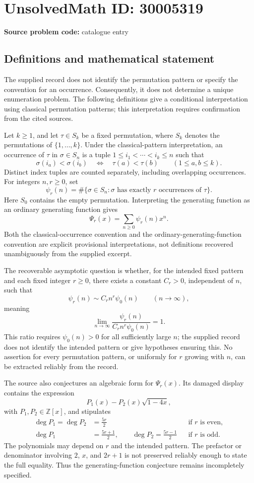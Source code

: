 \documentclass[11pt]{article}
\newcommand{\Z}{\mathbb{Z}}
\begin{document}
\section*{UnsolvedMath ID: 30005319}
\textbf{Source problem code:} catalogue entry
\subsection{Definitions and mathematical statement}
The supplied record does not identify the permutation pattern or specify the convention for an occurrence. Consequently, it does not determine a unique enumeration problem. The following definitions give a conditional interpretation using classical permutation patterns; this interpretation requires confirmation from the cited sources.

Let \(k\geq 1\), and let \(\tau\in S_k\) be a fixed permutation, where \(S_k\) denotes the permutations of \(\{1,\ldots,k\}\). Under the classical-pattern interpretation, an occurrence of \(\tau\) in \(\sigma\in S_n\) is a tuple \(1\leq i_1<\cdots<i_k\leq n\) such that
\[
\sigma(i_a)<\sigma(i_b)\quad\Longleftrightarrow\quad\tau(a)<\tau(b)
\qquad(1\leq a,b\leq k).
\]
Distinct index tuples are counted separately, including overlapping occurrences. For integers \(n,r\geq0\), set
\[
\psi_r(n)=\#\{\sigma\in S_n:\sigma\text{ has exactly }r\text{ occurrences of }\tau\}.
\]
Here \(S_0\) contains the empty permutation. Interpreting the generating function as an ordinary generating function gives
\[
\Psi_r(x)=\sum_{n\geq0}\psi_r(n)x^n.
\]
Both the classical-occurrence convention and the ordinary-generating-function convention are explicit provisional interpretations, not definitions recovered unambiguously from the supplied excerpt.

The recoverable asymptotic question is whether, for the intended fixed pattern and each fixed integer \(r\geq0\), there exists a constant \(C_r>0\), independent of \(n\), such that
\[
\psi_r(n)\sim C_r n^r\psi_0(n)\qquad(n\to\infty),
\]
meaning
\[
\lim_{n\to\infty}\frac{\psi_r(n)}{C_r n^r\psi_0(n)}=1.
\]
This ratio requires \(\psi_0(n)>0\) for all sufficiently large \(n\); the supplied record does not identify the intended pattern or give hypotheses ensuring this. No assertion for every permutation pattern, or uniformly for \(r\) growing with \(n\), can be extracted reliably from the record.

The source also conjectures an algebraic form for \(\Psi_r(x)\). Its damaged display contains the expression
\[
P_1(x)-P_2(x)\sqrt{1-4x},
\]
with \(P_1,P_2\in\Z[x]\), and stipulates
\[
\begin{aligned}
\deg P_1=\deg P_2&=\frac{5r}{2} &&\text{if }r\text{ is even},\\
\deg P_1&=\frac{5r+1}{2},\qquad
\deg P_2=\frac{5r-1}{2} &&\text{if }r\text{ is odd}.
\end{aligned}
\]
The polynomials may depend on \(r\) and the intended pattern. The prefactor or denominator involving \(2\), \(x\), and \(2r+1\) is not preserved reliably enough to state the full equality. Thus the generating-function conjecture remains incompletely specified.
\end{document}
